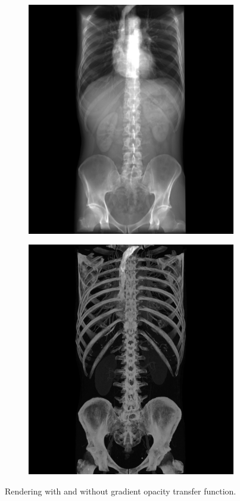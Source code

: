 \begin{figure}
\begin{subfigure}{.6\columnwidth}
    \includegraphics[width=\columnwidth]{TorsoBlendingAdditive.png}
\end{subfigure} 
\begin{subfigure}{.6\columnwidth}
    \includegraphics[width=\columnwidth]{TorsoBlendingMIP.png}
\end{subfigure}
\caption{Rendering with and without gradient opacity transfer function.}
\label{fig:blendingmodes}
\end{figure}

